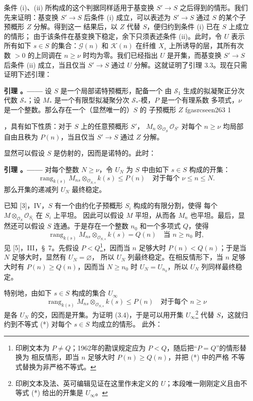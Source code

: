 \documentclass[12pt,twoside,openany]{book}
\numberwithin{equation}{section}
\newcommand{\fgaunitid}{unbound}
\newcommand{\src}[1]{%
  \phantomsection
  \hypertarget{src:\fgaunitid:#1}{}%
  \hypertarget{fga.\fgaunitid.p#1}{}%
  \ifcsname fgasrcseen#1\endcsname\else
    \expandafter\gdef\csname fgasrcseen#1\endcsname{1}%
    \hypertarget{src:#1}{}%
  \fi
  \marginpar{\raggedleft\footnotesize\sffamily #1}%
}
\theoremstyle{plain}
\theoremstyle{definition}
\theoremstyle{remark}
\newcommand{\result}[2]{%
  \par\medskip\noindent\textbf{#1%
  \if\relax\detokenize{#2}\relax\else\space#2\fi。——}\enspace
}
\begin{document}
条件 (i)、(ii) 所构成的这个判据同样适用于基变换
$S'\longrightarrow S$ 之后得到的情形。我们先来证明：基变换
$S'\longrightarrow S$ 后条件 (i) 成立，可以表述为
$S'\longrightarrow S$ 通过 $S$ 的某个子预概形 $Z$ 分解。得到这一
结果后，以 $Z$ 代替 $S$，便归约到条件 (i) 已在 $S$ 上成立的情形；
由于该条件在基变换下稳定，余下只须表述条件 (ii)。此时，令 $U$
表示所有如下 $s\in S$ 的集合：$\mathcal G(n)$ 和 $\mathcal K(n)$
在纤维 $X_s$ 上所诱导的层，其所有次数 $>0$ 的上同调在
$n\geq\nu$ 时均为零。我们已经指出 $U$ 是开集，而基变换
$S'\longrightarrow S$ 后条件 (ii) 成立，当且仅当
$S'\longrightarrow S$ 通过 $U$ 分解。这就证明了引理 3.3。现在只需
证明下述引理：

\result{引理}{3.4} 设 $S$ 是一个局部诺特预概形，配备一个
由 $\mathcal S_1$ 生成的拟凝聚正分次代数 $\mathcal S_*$；设 $M_*$
是一个有限型拟凝聚分次 $\mathcal S_*$-模，$P$ 是一个有理系数
多项式，$\nu$ 是一个整数。那么存在一个（显然唯一的）$S$ 的
子预概形 $Z$
\src{263}
，具有如下性质：对于 $S$ 上的任意预概形 $S'$，
$M_n\otimes_{\mathcal O_S}\mathcal O_{S'}$ 对每个 $n\geq\nu$
均局部自由且秩为 $P(n)$，当且仅当 $S'\longrightarrow S$ 通过 $Z$
分解。

显然可以假设 $S$ 是仿射的，因而是诺特的。此时：

\result{引理}{3.5} 对每个整数 $N\geq\nu$，令 $U_N$ 为 $S$ 中由如下
$s\in S$ 构成的开集：
\[
\operatorname{rang}_{k(s)}
M_{ns}\otimes_{\mathcal O_{S,s}}k(s)\leq P(n)
\quad\text{对于每个 $\nu\leq n\leq N$}.
\]
那么开集的递减列 $U_N$ 最终稳定。

已知 [3]，IV，$S$ 有一个由约化子预概形 $S_i$ 构成的有限分割，使得
每个 $M\otimes_{\mathcal O_S}\mathcal O_{S_i}$ 在 $S_i$ 上平坦。
因此可以假设 $M$ 平坦，从而各 $M_n$ 也平坦。最后，显然还可以假设
$S$ 连通。于是存在一个整数 $n_0$ 和一个多项式 $Q$，使得
\[
\operatorname{rang}_{k(s)}
M_{ns}\otimes_{\mathcal O_{S,s}}k(s)=Q(n)
\quad\text{当 $n\geq n_0$ 时},
\]
见 [5]，III，\S~7。先假设 $P<Q$\footnote{印刷文本为
$P\neq Q$；1962年的勘误规定应为 $P<Q$，随后把“$P=Q$”的情形替换为
相反情形，即当 $n$ 足够大时 $P(n)\geq Q(n)$，并把 (*) 中的严格
不等式替换为非严格不等式。}，因而当 $n$ 足够大时
$P(n)<Q(n)$；于是当 $N$ 足够大时，显然有 $U_N=\varnothing$，
所以 $U_N$ 列最终稳定。在相反情形下，当 $n$ 足够大时有
$P(n)\geq Q(n)$，因而当 $N\geq n_0$ 时 $U_N=U_{n_0}$，所以
$U_N$ 列同样最终稳定。

特别地，由如下 $s\in S$ 构成的集合 $U_\infty$
\[
\tag{*}
\operatorname{rang}_{k(s)}
M_{ns}\otimes_{\mathcal O_{S,s}}k(s)\leq P(n)
\quad\text{对于每个 $n\geq\nu$}
\]
是各 $U_N$ 的交，因而是开集。为证明 (3.4)，于是可以用开集
$U_\infty$\footnote{印刷文本及法、英可编辑见证在这里作未定义的
$U$；本段唯一刚刚定义且由不等式 (*) 给出的开集是 $U_\infty$。}
代替 $S$，这就归约到不等式 (*) 对每个 $s\in S$ 均成立的情形。
此外：
\end{document}
